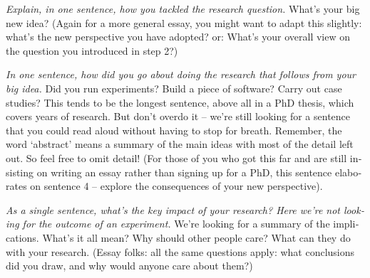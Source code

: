 \begin{otherlanguage}{american}
  \emph{Explain, in one sentence, how you tackled the research question.}
  What’s your big new idea?
  (Again for a more general essay, you might want to adapt this slightly: what’s the new perspective you have adopted? or:
  What’s your overall view on the question you introduced in step 2?)

  \emph{In one sentence, how did you go about doing the research that follows from your big idea.}
  Did you run experiments?
  Build a piece of software?
  Carry out case studies?
  This tends to be the longest sentence, above all in a PhD thesis, which covers years of research.
  But don’t overdo it – we’re still looking for a sentence that you could read aloud without having to stop for breath.
  Remember, the word ‘abstract’ means a summary of the main ideas with most of the detail left out.
  So feel free to omit detail!
  (For those of you who got this far and are still insisting on writing an essay rather than signing up for a PhD, this sentence elaborates on sentence 4 – explore the consequences of your new perspective).

  \emph{As a single sentence, what’s the key impact of your research?
    Here we’re not looking for the outcome of an experiment.
  }
  We’re looking for a summary of the implications.
  What’s it all mean?
  Why should other people care?
  What can they do with your research.
  (Essay folks: all the same questions apply: what conclusions did you draw, and why would anyone care about them?)
\end{otherlanguage}


%
%
\tableofcontents

\listoffigures

\listoftables
\listoflistings


